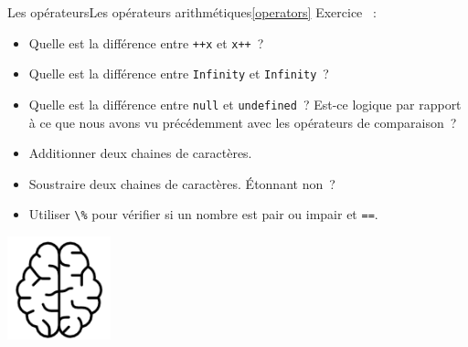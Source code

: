 \documentclass{beamer}
\begin{document}
\begin{frame}{Les opérateurs}{Les opérateurs arithmétiques\cref{operators}}
    Exercice \execcounterdispinc{}~:
    \begin{itemize}
        \item Quelle est la différence entre \lstinline{++x} et \lstinline{x++}~?
        \item Quelle est la différence entre \lstinline{Infinity} et \lstinline{Infinity}~?
        \item Quelle est la différence entre \lstinline{null} et \lstinline{undefined}~?
              Est-ce logique par rapport à ce que nous avons vu précédemment avec les
              opérateurs de comparaison~?
        \item Additionner deux chaines de caractères.
        \item Soustraire deux chaines de caractères. Étonnant non~?
        \item Utiliser
              \lstinline{\%} pour vérifier si un nombre est pair ou impair et \lstinline{==}.
    \end{itemize}
    \bigbreak
    \centering
    \includegraphics[width=3cm]{image/intelligence}
\end{frame}
\end{document}
